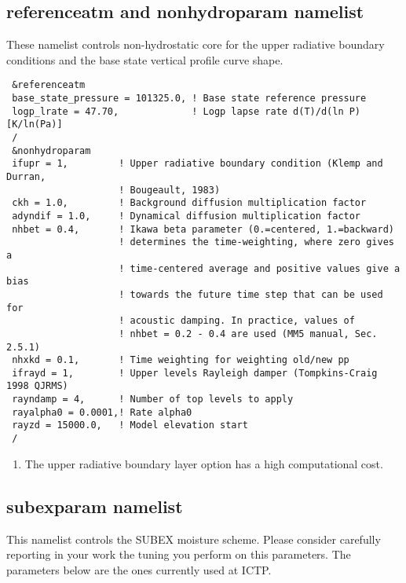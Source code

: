 \subsection{referenceatm and nonhydroparam namelist}

These namelist controls non-hydrostatic core for the upper radiative boundary
conditions and the base state vertical profile curve shape.

{\footnotesize
\begin{Verbatim}
 &referenceatm
 base_state_pressure = 101325.0, ! Base state reference pressure
 logp_lrate = 47.70,             ! Logp lapse rate d(T)/d(ln P) [K/ln(Pa)]
 /
 &nonhydroparam
 ifupr = 1,         ! Upper radiative boundary condition (Klemp and Durran,
                    ! Bougeault, 1983)
 ckh = 1.0,         ! Background diffusion multiplication factor
 adyndif = 1.0,     ! Dynamical diffusion multiplication factor
 nhbet = 0.4,       ! Ikawa beta parameter (0.=centered, 1.=backward)
                    ! determines the time-weighting, where zero gives a
                    ! time-centered average and positive values give a bias
                    ! towards the future time step that can be used for
                    ! acoustic damping. In practice, values of
                    ! nhbet = 0.2 - 0.4 are used (MM5 manual, Sec. 2.5.1)
 nhxkd = 0.1,       ! Time weighting for weighting old/new pp
 ifrayd = 1,        ! Upper levels Rayleigh damper (Tompkins-Craig 1998 QJRMS)
 rayndamp = 4,      ! Number of top levels to apply
 rayalpha0 = 0.0001,! Rate alpha0
 rayzd = 15000.0,   ! Model elevation start
 /
\end{Verbatim}
}

\begin{enumerate}
\item The upper radiative boundary layer option has a high computational cost.
\end{enumerate}

\subsection{subexparam namelist}

This namelist controls the SUBEX moisture scheme. Please consider carefully
reporting in your work the tuning you perform on this parameters.
The parameters below are the ones currently used at ICTP.

